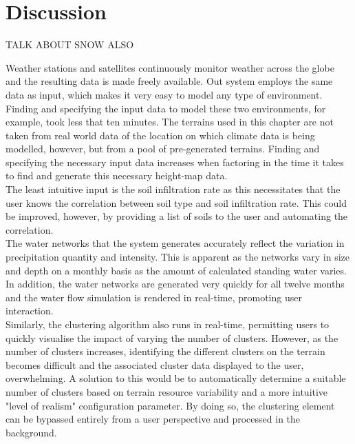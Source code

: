 \section{Discussion}

TALK ABOUT SNOW ALSO

Weather stations and satellites continuously monitor weather across the globe and the resulting data is made freely available. Out system employs the same data as input, which makes it very easy to model any type of environment. Finding and specifying the input data to model these two environments, for example, took less that ten minutes. The terrains used in this chapter are not taken from real world data of the location on which climate data is being modelled, however, but from a pool of pre-generated terrains. Finding and specifying the necessary input data increases when factoring in the time it takes to find and generate this necessary height-map data.\\
The least intuitive input is the soil infiltration rate as this necessitates that the user knows the correlation between soil type and soil infiltration rate. This could be improved, however, by providing a list of soils to the user and automating the correlation.\\

The water networks that the system generates accurately reflect the variation in precipitation quantity and intensity. This is apparent as the networks vary in size and depth on a monthly basis as the amount of calculated standing water varies. In addition, the water networks are generated very quickly for all twelve months and the water flow simulation is rendered in real-time, promoting user interaction. \\

Similarly, the clustering algorithm also runs in real-time, permitting users to quickly visualise the impact of varying the number of clusters. However, as the number of clusters increases, identifying the different clusters on the terrain becomes difficult and the associated cluster data displayed to the user, overwhelming. A solution to this would be to automatically determine a suitable number of clusters based on terrain resource variability and a more intuitive "level of realism" configuration parameter. By doing so, the clustering element can be bypassed entirely from a user perspective and processed in the background.\\

